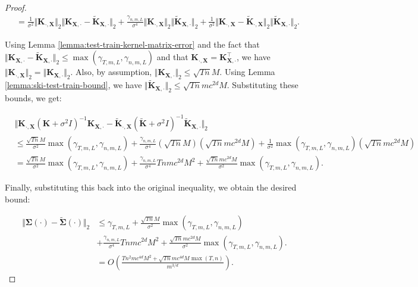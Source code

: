 \begin{proof}
\begin{align*}
    &= \frac{1}{\sigma^2} \Vert \textbf{K}_{\cdot,\textbf{X}}\Vert_2 \Vert \textbf{K}_{\textbf{X},\cdot}-\tilde{\textbf{K}}_{\textbf{X},\cdot}\Vert_2 + \frac{\gamma_{n,m,L}}{\sigma^4}\Vert \textbf{K}_{\cdot,\textbf{X}} \Vert_2  \Vert \tilde{\textbf{K}}_{\textbf{X},\cdot} \Vert_2 + \frac{1}{\sigma^2} \Vert \textbf{K}_{\cdot,\textbf{X}} - \tilde{\textbf{K}}_{\cdot,\textbf{X}} \Vert_2 \Vert \tilde{\textbf{K}}_{\textbf{X},\cdot} \Vert_2.
\end{align*}

Using Lemma \ref{lemma:test-train-kernel-matrix-error} and the fact that $\Vert \textbf{K}_{\textbf{X},\cdot}-\tilde{\textbf{K}}_{\textbf{X},\cdot}\Vert_2 \leq \max(\gamma_{T,m,L},\gamma_{n,m,L})$ and that $\textbf{K}_{\cdot, \textbf{X}} = \textbf{K}_{\textbf{X},\cdot}^\top$, we have $\Vert \textbf{K}_{\cdot,\textbf{X}} \Vert_2 = \Vert \textbf{K}_{\textbf{X},\cdot} \Vert_2$. Also, by assumption, $\Vert \textbf{K}_{\textbf{X},\cdot} \Vert_2 \leq \sqrt{Tn}M$. Using Lemma \ref{lemma:ski-test-train-bound}, we have $\Vert \tilde{\textbf{K}}_{\textbf{X},\cdot} \Vert_2 \leq \sqrt{Tn}mc^{2d}M$. Substituting these bounds, we get:

\begin{align*}
    &\Vert \textbf{K}_{\cdot,\textbf{X}} (\textbf{K}+\sigma^2 I)^{-1}\textbf{K}_{\textbf{X},\cdot}-\tilde{\textbf{K}}_{\cdot,\textbf{X}} (\tilde{\textbf{K}}+\sigma^2 I)^{-1}\tilde{\textbf{K}}_{\textbf{X},\cdot}\Vert_2 \\
    &\leq \frac{\sqrt{Tn}M}{\sigma^2} \max(\gamma_{T,m,L},\gamma_{n,m,L}) + \frac{\gamma_{n,m,L}}{\sigma^4}(\sqrt{Tn}M)(\sqrt{Tn} m c^{2d} M) + \frac{1}{\sigma^2} \max(\gamma_{T,m,L},\gamma_{n,m,L}) (\sqrt{Tn} m c^{2d} M) \\
    &= \frac{\sqrt{Tn}M}{\sigma^2} \max(\gamma_{T,m,L},\gamma_{n,m,L}) + \frac{\gamma_{n,m,L}}{\sigma^4}Tn m c^{2d} M^2 + \frac{\sqrt{Tn} m c^{2d} M}{\sigma^2} \max(\gamma_{T,m,L},\gamma_{n,m,L}).
\end{align*}

Finally, substituting this back into the original inequality, we obtain the desired bound:

\begin{align*}
    \Vert \boldsymbol{\Sigma}(\cdot)-\tilde{\boldsymbol{\Sigma}}(\cdot)\Vert_2 &\leq \gamma_{T,m,L} + \frac{\sqrt{Tn}M}{\sigma^2} \max(\gamma_{T,m,L},\gamma_{n,m,L})\\
    &+ \frac{\gamma_{n,m,L}}{\sigma^4}Tn m c^{2d} M^2 + \frac{\sqrt{Tn} m c^{2d} M}{\sigma^2} \max(\gamma_{T,m,L},\gamma_{n,m,L}).\\
    &=O\left(\frac{Tn^2mc^{4d}M^2+\sqrt{Tn}mc^{4d}M\max(T,n)}{m^{3/d}}\right).
\end{align*}
\end{proof}